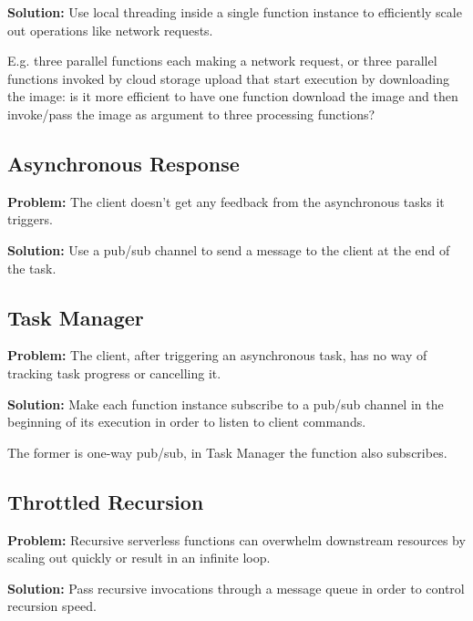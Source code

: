 \textbf{Solution:} Use local threading inside a single function instance to efficiently scale out operations like network requests.

E.g. three parallel functions each making a network request, or three parallel functions invoked by cloud storage upload that start execution by downloading the image: is it more efficient to have one function download the image and then invoke/pass the image as argument to three processing functions?

\subsection{Asynchronous Response} \label{subsec:AsyncResponse}

\textbf{Problem:} The client doesn't get any feedback from the asynchronous tasks it triggers.

\textbf{Solution:} Use a pub/sub channel to send a message to the client at the end of the task.

\subsection{Task Manager} \label{subsec:taskManager}

\textbf{Problem:} The client, after triggering an asynchronous task, has no way of tracking task progress or cancelling it.

\textbf{Solution:} Make each function instance subscribe to a pub/sub channel in the beginning of its execution in order to listen to client commands.

The former is one-way pub/sub, in Task Manager the function also subscribes.

\subsection{Throttled Recursion} \label{subsec:throttledRecursion}

\textbf{Problem:} Recursive serverless functions can overwhelm downstream resources by scaling out quickly or result in an infinite loop.

\textbf{Solution:} Pass recursive invocations through a message queue in order to control recursion speed.
